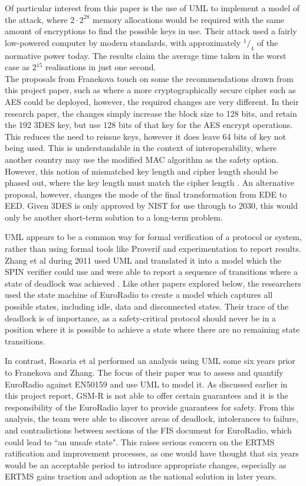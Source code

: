 \documentclass[twoside,11pt,a4paper]{article}
\begin{document}
Of particular interest from this paper is the use of UML to implement a model of the attack, where $2\cdot2^{28}$ memory allocations would be required with the same amount of encryptions to find the possible keys in use. Their attack used a fairly low-powered computer by modern standards, with approximately $^{1}/_{4}$ of the normative power today. The results claim the average time taken in the worst case as 2$^{15}$ realisations in just one second.\\
The proposals from Franekova touch on some the recommendations drawn from this project paper, such as where a more cryptographically secure cipher such as AES could be deployed, however, the required changes are very different. In their research paper, the changes simply increase the block size to 128 bits, and retain the 192 3DES key, but use 128 bits of that key for the AES encrypt operations. This reduces the need to reissue keys, however it does leave 64 bits of key not being used. This is understandable in the context of interoperability, where another country may use the modified MAC algorithm as the safety option. However, this notion of mismatched key length and cipher length should be phased out, where the key length must match the cipher length \citep{Garcia13}. An alternative proposal, however, changes the mode of the final transformation from EDE to EED. Given 3DES is only approved by NIST for use through to 2030, this would only be another short-term solution to a long-term problem.

UML appears to be a common way for formal verification of a protocol or system, rather than using formal tools like Proverif and experimentation to report results. Zhang et al during 2011 used UML and translated it into a model which the SPIN verifier could use and were able to report a sequence of transitions where a state of deadlock was achieved \citep{Yan11a}. Like other papers explored below, the researchers used the state machine of EuroRadio to create a model which captures all possible states, including idle, data and disconnected states. Their trace of the deadlock is of importance, as a safety-critical protocol should never be in a position where it is possible to achieve a state where there are no remaining state transitions.

In contrast, Rosaria et al \citep{Ansaldo05a} performed an analysis using UML some six years prior to Franekova and Zhang. The focus of their paper was to assess and quantify EuroRadio against EN50159 and use UML to model it. As discussed earlier in this project report, GSM-R is not able to offer certain guarantees and it is the responsibility of the EuroRadio layer to provide guarantees for safety. From this analysis, the team were able to discover areas of deadlock, intolerances to failure, and contradictions between sections of the FIS document for EuroRadio, which could lead to ``an unsafe state". This raises serious concern on the ERTMS ratification and improvement processes, as one would have thought that six years would be an acceptable period to introduce appropriate changes, especially as ERTMS gains traction and adoption as the national solution in later years.
\end{document}
